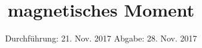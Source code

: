 

\subject{105}
\title{magnetisches Moment}
\date{%
  Durchführung: 21. Nov. 2017
  \hspace{3em}
  Abgabe: 28. Nov. 2017
}



\maketitle
\thispagestyle{empty}
\tableofcontents
\newpage







\printbibliography{}


